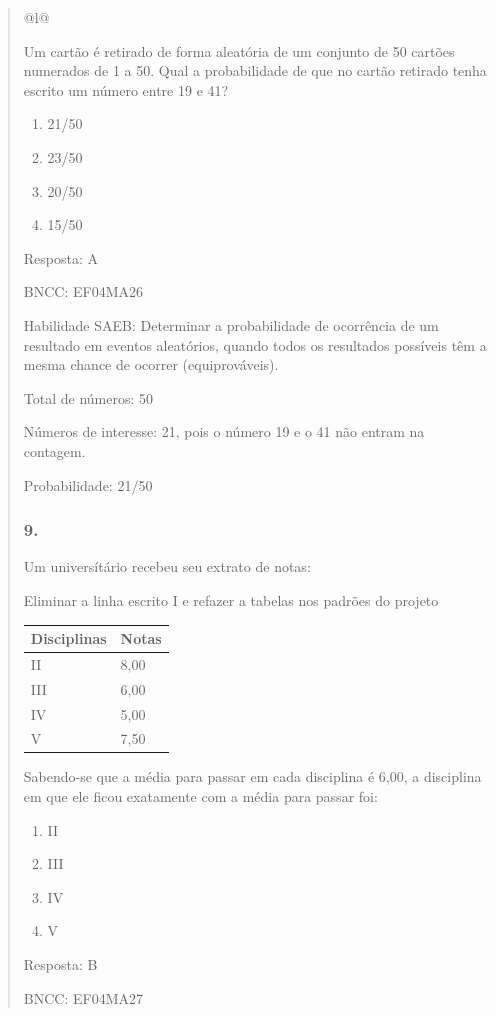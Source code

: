 \begin{enumerate}
\begin{escolha}
\begin{enumerate}
\begin{itemize}
\begin{itemize}
\begin{escolha}
\begin{quote}
\begin{escolha}
{\begin{longtable}[]{@{}l@{}}
\begin{itemize}
Um cartão é retirado de forma aleatória de um conjunto de 50 cartões
numerados de 1 a 50. Qual a probabilidade de que no cartão retirado
tenha escrito um número entre 19 e 41?

\begin{enumerate}
\def\labelenumi{\alph{enumi})}
\item
  21/50
\item
  23/50
\item
  20/50
\item
  15/50
\end{enumerate}

Resposta: A

BNCC: EF04MA26

Habilidade SAEB: Determinar a probabilidade de ocorrência de um
resultado em eventos aleatórios, quando todos os resultados possíveis
têm a mesma chance de ocorrer (equiprováveis).

Total de números: 50

Números de interesse: 21, pois o número 19 e o 41 não entram na
contagem.

Probabilidade: 21/50

\subsubsection{9.}\label{section-180}

Um universítário recebeu seu extrato de notas:

Eliminar a linha escrito I e refazer a tabelas nos padrões do projeto

\begin{longtable}[]{@{}ll@{}}
\toprule
Disciplinas & Notas\tabularnewline
\midrule
\endhead
II & 8,00\tabularnewline
III & 6,00\tabularnewline
IV & 5,00\tabularnewline
V & 7,50\tabularnewline
\bottomrule
\end{longtable}

Sabendo-se que a média para passar em cada disciplina é 6,00, a
disciplina em que ele ficou exatamente com a média para passar foi:

\begin{enumerate}
\def\labelenumi{\alph{enumi})}
\item
  II
\item
  III
\item
  IV
\item
  V
\end{enumerate}

Resposta: B

BNCC: EF04MA27


\end{itemize}
\end{longtable}}
\end{escolha}
\end{quote}
\end{escolha}
\end{itemize}
\end{itemize}
\end{enumerate}
\end{escolha}
\end{enumerate}
